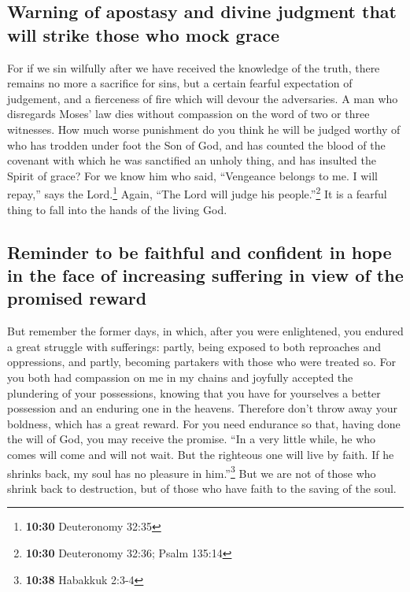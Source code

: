 \hypertarget{warning-of-apostasy-and-divine-judgment-that-will-strike-those-who-mock-grace}{%
\subsection{Warning of apostasy and divine judgment that will strike
those who mock
grace}\label{warning-of-apostasy-and-divine-judgment-that-will-strike-those-who-mock-grace}}

 For if we sin wilfully after we have received the
knowledge of the truth, there remains no more a sacrifice for sins,
 but a certain fearful expectation of judgement, and a
fierceness of fire which will devour the adversaries.  A
man who disregards Moses' law dies without compassion on the word of two
or three witnesses.  How much worse punishment do you
think he will be judged worthy of who has trodden under foot the Son of
God, and has counted the blood of the covenant with which he was
sanctified an unholy thing, and has insulted the Spirit of grace?
 For we know him who said, ``Vengeance belongs to me. I
will repay,'' says the Lord.\footnote{\textbf{10:30} Deuteronomy 32:35}
Again, ``The Lord will judge his people.''\footnote{\textbf{10:30}
  Deuteronomy 32:36; Psalm 135:14}  It is a fearful thing
to fall into the hands of the living God.

\hypertarget{reminder-to-be-faithful-and-confident-in-hope-in-the-face-of-increasing-suffering-in-view-of-the-promised-reward}{%
\subsection{Reminder to be faithful and confident in hope in the face of
increasing suffering in view of the promised
reward}\label{reminder-to-be-faithful-and-confident-in-hope-in-the-face-of-increasing-suffering-in-view-of-the-promised-reward}}

 But remember the former days, in which, after you were
enlightened, you endured a great struggle with sufferings:
 partly, being exposed to both reproaches and
oppressions, and partly, becoming partakers with those who were treated
so.  For you both had compassion on me in my chains and
joyfully accepted the plundering of your possessions, knowing that you
have for yourselves a better possession and an enduring one in the
heavens.  Therefore don't throw away your boldness, which
has a great reward.  For you need endurance so that,
having done the will of God, you may receive the promise.
 ``In a very little while, he who comes will come and
will not wait.  But the righteous one will live by faith.
If he shrinks back, my soul has no pleasure in him.''\footnote{\textbf{10:38}
  Habakkuk 2:3-4}  But we are not of those who shrink
back to destruction, but of those who have faith to the saving of the
soul.


